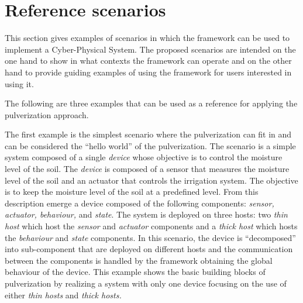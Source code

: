 
\section{Reference scenarios}
\label{sec:reference-scenarios}

This section gives examples of scenarios in which the framework can be used to implement a Cyber-Physical System.
The proposed scenarios are intended on the one hand to show in what contexts the framework can operate and on the other hand to provide guiding
examples of using the framework for users interested in using it.

The following are three examples that can be used as a reference for applying the pulverization approach.

The first example is the simplest scenario where the pulverization can fit in and can be considered the ``hello world'' of the pulverization.
The scenario is a simple system composed of a single \emph{device} whose objective is to control the moisture level of the soil.
The \emph{device} is composed of a sensor that measures the moisture level of the soil and an actuator that controls the irrigation system.
The objective is to keep the moisture level of the soil at a predefined level. From this description emerge a device composed of the following
components: \emph{sensor, actuator, behaviour,} and \emph{state}. The system is deployed on three hosts: two \emph{thin host} which host the
\emph{sensor} and \emph{actuator} components and a \emph{thick host} which hosts the \emph{behaviour} and \emph{state} components.
In this scenario, the device is ``decomposed'' into sub-component that are deployed on different hosts and the communication between the
components is handled by the framework obtaining the global behaviour of the device. This example shows the basic building blocks of pulverization
by realizing a system with only one device focusing on the use of either \emph{thin hosts} and \emph{thick hosts.}

